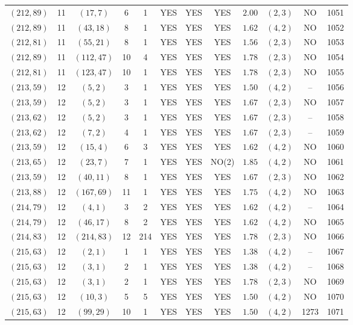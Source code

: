 \begin{longtable}{|c|c|c|c|c|c|c|c|c|c|c|c|}
$(212,89)$ & 11 & $(17,7)$ & 6 & 1 & YES & YES & YES & $2.00$ & $(2,3)$ & NO & 1051\\
$(212,89)$ & 11 & $(43,18)$ & 8 & 1 & YES & YES & YES & $1.62$ & $(4,2)$ & NO & 1052\\
$(212,81)$ & 11 & $(55,21)$ & 8 & 1 & YES & YES & YES & $1.56$ & $(2,3)$ & NO & 1053\\
$(212,89)$ & 11 & $(112,47)$ & 10 & 4 & YES & YES & YES & $1.78$ & $(2,3)$ & NO & 1054\\
$(212,81)$ & 11 & $(123,47)$ & 10 & 1 & YES & YES & YES & $1.78$ & $(2,3)$ & NO & 1055\\
$(213,59)$ & 12 & $(5,2)$ & 3 & 1 & YES & YES & YES & $1.50$ & $(4,2)$ & -- & 1056\\
$(213,59)$ & 12 & $(5,2)$ & 3 & 1 & YES & YES & YES & $1.67$ & $(2,3)$ & NO & 1057\\
$(213,62)$ & 12 & $(5,2)$ & 3 & 1 & YES & YES & YES & $1.67$ & $(2,3)$ & -- & 1058\\
$(213,62)$ & 12 & $(7,2)$ & 4 & 1 & YES & YES & YES & $1.67$ & $(2,3)$ & -- & 1059\\
$(213,59)$ & 12 & $(15,4)$ & 6 & 3 & YES & YES & YES & $1.62$ & $(4,2)$ & NO & 1060\\
$(213,65)$ & 12 & $(23,7)$ & 7 & 1 & YES & YES & NO(2) & $1.85$ & $(4,2)$ & NO & 1061\\
$(213,59)$ & 12 & $(40,11)$ & 8 & 1 & YES & YES & YES & $1.67$ & $(2,3)$ & NO & 1062\\
$(213,88)$ & 12 & $(167,69)$ & 11 & 1 & YES & YES & YES & $1.75$ & $(4,2)$ & NO & 1063\\
$(214,79)$ & 12 & $(4,1)$ & 3 & 2 & YES & YES & YES & $1.62$ & $(4,2)$ & -- & 1064\\
$(214,79)$ & 12 & $(46,17)$ & 8 & 2 & YES & YES & YES & $1.62$ & $(4,2)$ & NO & 1065\\
$(214,83)$ & 12 & $(214,83)$ & 12 & 214 & YES & YES & YES & $1.78$ & $(2,3)$ & NO & 1066\\
$(215,63)$ & 12 & $(2,1)$ & 1 & 1 & YES & YES & YES & $1.38$ & $(4,2)$ & -- & 1067\\
$(215,63)$ & 12 & $(3,1)$ & 2 & 1 & YES & YES & YES & $1.38$ & $(4,2)$ & -- & 1068\\
$(215,63)$ & 12 & $(3,1)$ & 2 & 1 & YES & YES & YES & $1.78$ & $(2,3)$ & NO & 1069\\
$(215,63)$ & 12 & $(10,3)$ & 5 & 5 & YES & YES & YES & $1.50$ & $(4,2)$ & NO & 1070\\
$(215,63)$ & 12 & $(99,29)$ & 10 & 1 & YES & YES & YES & $1.50$ & $(4,2)$ & 1273 & 1071\\

\end{longtable}
